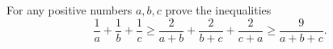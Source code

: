 For any positive numbers $a, b, c$ prove the inequalities\[\frac{1}{a}+\frac{1}{b}+\frac{1}{c}\ge \frac{2}{a+b}+\frac{2}{b+c}+\frac{2}{c+a}\ge \frac{9}{a+b+c}.\]